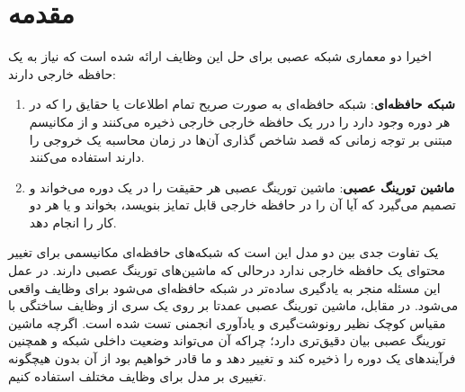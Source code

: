 \chapter{مقدمه}

اخیرا دو معماری شبکه عصبی برای حل این وظایف ارائه شده است که نیاز به یک حافظه خارجی دارند:
\begin{enumerate}
\item \textbf{شبکه حافظه‌ای}: شبکه حافظه‌ای به صورت صریح تمام اطلاعات یا حقایق را که در هر دوره وجود دارد را درر یک حافظه خارجی خارجی ذخیره می‌کنند و از مکانیسم مبتنی بر توجه زمانی که قصد شاخص گذاری آن‌ها در زمان محاسبه یک خروجی را دارند استفاده می‌کنند.
\item \textbf{ماشین‌ تورینگ عصبی}: ماشین تورینگ عصبی هر حقیقت را در یک دوره می‌خواند و تصمیم می‌گیرد که آیا آن را در حافظه خارجی قابل تمایز بنویسد، بخواند و یا هر دو کار را انجام دهد.\cite{gulcehre2018dynamic}
\end{enumerate}


یک تفاوت جدی بین دو مدل این است که شبکه‌های حافظه‌ای مکانیسمی برای تغییر محتوای یک حافظه خارجی ندارد درحالی که ماشین‌های تورینگ عصبی دارند. در عمل این مسئله منجر به یادگیری ساده‌تر در شبکه حافظه‌ای می‌شود برای وظایف واقعی می‌شود. در مقابل، ماشین تورینگ عصبی عمدتا بر روی یک سری از وظایف ساختگی  با مقیاس کوچک نظیر رونوشت‌گیری و یادآوری انجمنی تست شده است. اگرچه ماشین تورینگ عصبی بیان دقیق‌تری دارد؛ چراکه آن می‌تواند وضعیت داخلی شبکه و همچنین فرآیند‌های یک دوره را ذخیره کند و تغییر دهد و ما قادر خواهیم بود از آن بدون هیچگونه تغییری بر مدل برای وظایف مختلف استفاده کنیم.\cite{gulcehre2018dynamic}